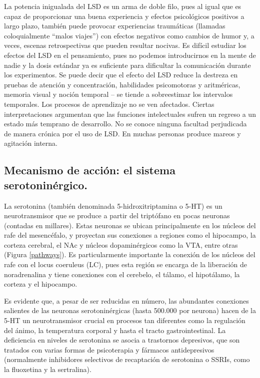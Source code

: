 La potencia inigualada del LSD es un arma de doble filo, pues al igual que es capaz de proporcionar una buena experiencia y efectos psicológicos positivos a largo plazo, también puede provocar experiencias traumáticas (llamadas coloquialmente \enquote{malos viajes}) con efectos negativos como cambios de humor y, a veces, escenas retrospectivas que pueden resultar nocivas. Es difícil estudiar los efectos del LSD en el pensamiento, pues no podemos introducirnos en la mente de nadie y la dosis estándar ya es suficiente para dificultar la comunicación durante los experimentos. Se puede decir que el efecto del LSD reduce la destreza en pruebas de atención y concentración, habilidades psicomotoras y aritméricas, memoria visual y noción temporal – se tiende a sobreestimar los intervalos temporales. Los procesos de aprendizaje no se ven afectados. Ciertas interpretaciones argumentan que las funciones intelectuales sufren un regreso a un estado más temprano de desarrollo. No se conoce ninguna facultad perjudicada de manera crónica por el uso de LSD. En muchas personas produce mareos y agitación interna.

\subsection{Mecanismo de acción: el sistema serotoninérgico.}

La serotonina (también denominada 5-hidroxitriptamina o 5-HT) es un neurotransmisor que se produce a partir del triptófano en pocas neuronas (contadas en millares). Estas neuronas se ubican principalmente en los núcleos del rafe del mesencéfalo, y proyectan sus conexiones a regiones como el hipocampo, la corteza cerebral, el NAc y núcleos dopaminérgicos como la VTA, entre otras (Figura \ref{pathways}). Es particularmente importante la conexión de los núcleos del rafe con el locus coeruleus (LC), pues esta región se encarga de la liberación de noradrenalina y tiene conexiones con el cerebelo, el tálamo, el hipotálamo, la corteza y el hipocampo.

Es evidente que, a pesar de ser reducidas en número, las abundantes conexiones salientes de las neuronas serotoninérgicas (hasta 500.000 por neurona) hacen de la 5-HT un neurotransmisor crucial en procesos tan diferentes como la regulación del ánimo, la temperatura corporal y hasta el tracto gastrointestinal. La deficiencia en niveles de serotonina se asocia a trastornos depresivos, que son tratados con varias formas de psicoterapia y fármacos antidepresivos (normalmente inhibidores selectivos de recaptación de serotonina o SSRIs, como la fluoxetina y la sertralina).

